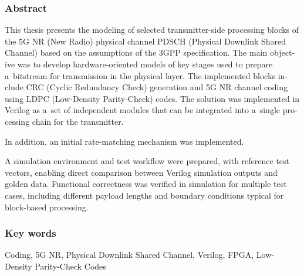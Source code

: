 \subsubsection*{Abstract} 
\begin{otherlanguage}{british}
This thesis presents the modeling of selected transmitter-side processing blocks of the 5G NR (New Radio) physical channel PDSCH (Physical Downlink Shared Channel) based on the assumptions of the 3GPP specification. The main objective was to develop hardware-oriented models of key stages used to prepare a~bitstream for transmission in the physical layer. The implemented blocks include CRC (Cyclic Redundancy Check) generation and 5G NR channel coding using LDPC (Low-Density Parity-Check) codes. The solution was implemented in Verilog as a~set of independent modules that can be integrated into a~single processing chain for the transmitter.

In addition, an initial rate-matching mechanism was implemented.

A simulation environment and test workflow were prepared, with reference test vectors, enabling direct comparison between Verilog simulation outputs and golden data. Functional correctness was verified in simulation for multiple test cases, including different payload lengths and boundary conditions typical for block-based processing.

\end{otherlanguage}
\subsubsection*{Key words}  
\begin{otherlanguage}{british}
Coding, 5G NR, Physical Downlink Shared Channel, Verilog, FPGA, Low-Density Parity-Check Codes
\end{otherlanguage}

